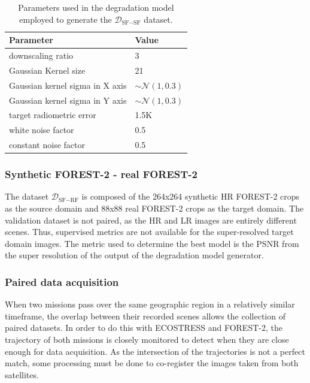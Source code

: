     \begin{table}[H]
        \centering
        \begin{tabular}{l|l}
        Parameter & Value \\ \hline
        downscaling ratio & 3 \\ 
        Gaussian Kernel size & 21 \\ 
        Gaussian kernel sigma in X axis &  $\sim \mathcal{N}(1,0.3)$  \\ 
        Gaussian kernel sigma in Y axis &  $\sim \mathcal{N}(1,0.3)$  \\ 
        target radiometric error & 1.5K \\ 
        white noise factor & 0.5 \\ 
        constant noise factor & 0.5 \\ 
        \end{tabular}
        \caption{Parameters used in the degradation model employed to generate the $\mathcal{D}_{\text{SF}-\text{SF}}$ dataset.}
        \label{tab:degradation_model_parameters}
    \end{table}

\subsubsection{Synthetic FOREST-2 - real FOREST-2}
    The dataset $\mathcal{D}_{\text{SF}-\text{RF}}$ is composed of the 264x264 synthetic HR FOREST-2 crops as the source domain and  88x88 real FOREST-2 crops as the target domain. 
    The validation dataset is not paired, as the HR and LR images are entirely different scenes.
    Thus, supervised metrics are not available for the super-resolved target domain images. 
    The metric used to determine the best model is the PSNR from the super resolution of the output of the degradation model generator.

\subsubsection{Paired data acquisition} \label{subsec:pairedacquisition}

    When two missions pass over the same geographic region in a relatively similar timeframe, the overlap between their recorded scenes allows the collection of paired datasets. In order to do this with ECOSTRESS and FOREST-2, the trajectory of both missions is closely monitored to detect when they are close enough for data acquisition. As the intersection of the trajectories is not a perfect match, some processing must be done to co-register the images taken from both satellites. 

